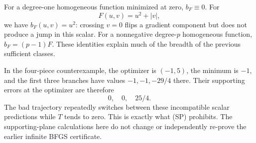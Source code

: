 \documentclass[10pt,oneside,openany]{book}
\theoremstyle{remark}\newtheorem{remark}{Remark}[chapter]
\begin{document}
For a degree-one homogeneous function minimized at zero, $b_F\equiv0$. For
\[
 F(u,v)=u^2+|v|,
\]
we have $b_F(u,v)=u^2$: crossing $v=0$ flips a gradient component but does not produce a jump in this scalar. For a nonnegative degree-$p$ homogeneous function, $b_F=(p-1)F$. These identities explain much of the breadth of the previous sufficient classes.

In the four-piece counterexample, the optimizer is $(-1,5)$, the minimum is $-1$, and the first three branches have values $-1,-1,-29/4$ there. Their supporting errors at the optimizer are therefore
\[
 0,\quad0,\quad25/4.
\]
The bad trajectory repeatedly switches between these incompatible scalar predictions while $T$ tends to zero. This is exactly what (SP) prohibits. The supporting-plane calculations here do not change or independently re-prove the earlier infinite BFGS certificate.


\setcounter{section}{4}
\setcounter{theorem}{0}
\setcounter{equation}{8}
\end{document}
